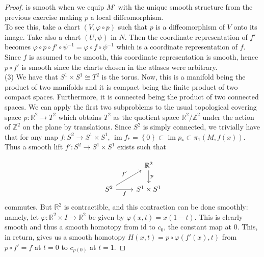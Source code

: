 \documentclass[reqno]{amsart}
\theoremstyle{definition}
\theoremstyle{remark}
\DeclareMathOperator{\im}{im}
\newcommand{\id}{{\mathrm{id}}}
\begin{document}
\begin{proof}
        is smooth when we equip $M'$ with
        the unique smooth structure from
        the previous exercise making $p$ a local
        diffeomorphism.\\
        To see this,
        take a chart $\left( V, \varphi \circ p \right) $ 
        such that $p$ is a diffeomorphism
        of $V$ onto its image. Take
        also a chart
        $\left( U, \psi  \right) $ in
        $N$. Then the coordinate representation of
        $f'$ becomes
        $\varphi \circ p \circ f' \circ \psi^{-1}
        = \varphi \circ f \circ \psi^{-1}$ which is
        a coordinate representation of
        $f$. Since $f$ is assumed to be smooth,
        this coordinate representation is
        smooth, hence 
        $p \circ f'$ is smooth since the charts
        chosen in the atlases were arbitrary.\\
        \linebreak
        (3) We have that $S^{1} \times S^{1} 
        \cong T^2$ is the torus.
        Now, this is a manifold being the product
        of two manifolds and it is compact being
        the finite product of two compact spaces. 
        Furthermore, it is connected being the
        product of two connected spaces. We can
        apply the first two subproblems 
        to the usual topological covering
        space
        $p \colon \mathbb{R}^2 \to T^2$ which
        obtains $T^2$ as the quotient space
        $\mathbb{R}^2 / \mathbb{Z}^2$ under the action
        of $\mathbb{Z}^2$ on the plane by
        translations. 
        Since $S^2$ is simply connected, we
        trivially have that for any map
        $f \colon S^2 \to S^{1} \times S^{1}$,
         $\im f_* = \left\{ 0 \right\} \subset 
         \im p_* \subset \pi_1 \left( M, f(x) \right)$.
         Thus a smooth lift
         $f' \colon
         S^{2} \to S^{1} \times S^{1}$ exists such that


        \begin{equation*}
        \begin{tikzcd}
            & \mathbb{R}^2 \ar[d, "p"] \\
            S^{2} \ar[r, "f"'] \ar[ru, "f'"] & S^{1}\times 
            S^{1}
        \end{tikzcd}
        \end{equation*}
        commutes.
        But $\mathbb{R}^2$ is contractible, and this
        contraction can be done smoothly:
        namely, let $\varphi \colon
        \mathbb{R}^2 \times I \to \mathbb{R}^2$ be
        given by
        $\varphi (x,t) = x(1-t)$. This is clearly smooth
        and thus a smooth homotopy from
        $\id$ to $c_{0}$, the constant map at $0$.
        This, in return, gives us a smooth homotopy
        $H(x,t) = p \circ \varphi (f'(x),t)$
        from
        $p \circ f' = f$ at $t = 0$ to
        $c_{p(0)}$ at $t = 1$.

    \end{proof}
\end{document}
